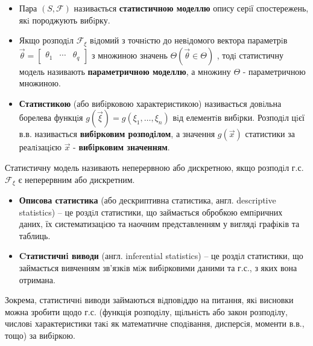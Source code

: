 \begin{itemize}
\item Пара $(S,\mathcal{F})$ називається \textbf{\color{javadocblue} статистичною моделлю} опису серiї спостережень, якi породжують вибiрку. \item Якщо розподiл $\mathcal{F}_{\xi}$ вiдомий з точнiстю до невiдомого вектора параметрiв $\overrightarrow{\theta} = \begin{bmatrix}
 \theta_1 & \cdots & \theta_q
\end{bmatrix}$ з множиною значень
$\Theta (\overrightarrow{\theta} \in \Theta)$
, тодi статистичну модель називають \textbf{\color{javadocblue} параметричною моделлю},
а множину $\Theta$ - параметричною множиною.
\item \textbf{\color{javared} Статистикою} (або вибiрковою характеристикою) називається довiльна борелева функцiя $g(\overrightarrow{\xi}) = g(\xi_1, \dots , \xi_n)$ вiд елементiв вибiрки. Розподiл цiєї в.в. називається
\textbf{\color{javadocblue} вибiрковим розподiлом}, а значення $g(\overrightarrow{x})$  статистики за реалiзацiєю $\overrightarrow{x}$ - \textbf{ \color{javadocblue} вибiрковим
значенням}.
\end{itemize}
Статистичну модель називають неперервною або дискретною, якщо розподiл г.с. $\mathcal{F}_\xi$ є
неперервним або дискретним.
\begin{itemize}
\item
\textbf{\color{javared} Описова статистика} (або дескриптивна статистика, англ. descriptive statistics) – це
роздiл статистики, що займається обробкою емпiричних даних, їх систематизацiєю та
наочним представленням у виглядi графiкiв та таблиць.
\item
\textbf{\color{javared} Cтатистичнi виводи} (англ. inferential statistics) – це роздiл статистики, що займається
вивченням зв’язкiв мiж вибiрковими даними та г.с., з яких вона отримана.
\end{itemize}
Зокрема, статистичнi виводи займаються вiдповiддю на питання, якi висновки можна зробити
щодо г.с. (функцiя розподiлу, щiльнiсть або закон розподiлу, числовi характеристики такi як
математичне сподiвання, дисперсiя, моменти в.в., тощо) за вибiркою.
